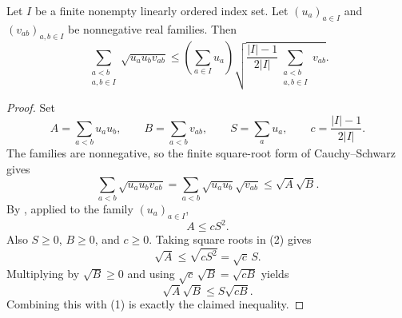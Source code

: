 \begin{helper}
Let $I$ be a finite nonempty linearly ordered index set.  Let
$(u_a)_{a\in I}$ and $(v_{ab})_{a,b\in I}$ be nonnegative real families.  Then
\[
\sum_{\substack{a<b\\a,b\in I}}\sqrt{u_a u_b v_{ab}}
\le
\left(\sum_{a\in I}u_a\right)
\sqrt{
\frac{|I|-1}{2|I|}
\sum_{\substack{a<b\\a,b\in I}}v_{ab}}.
\]
\end{helper}
\begin{proof}
Set
\[
A=\sum_{a<b}u_a u_b,\qquad
B=\sum_{a<b}v_{ab},\qquad
S=\sum_a u_a,\qquad
c=\frac{|I|-1}{2|I|}.
\]
The families are nonnegative, so the finite square-root form of
Cauchy--Schwarz gives
\[
\sum_{a<b}\sqrt{u_a u_b v_{ab}}
=\sum_{a<b}\sqrt{u_a u_b}\sqrt{v_{ab}}
\le \sqrt{A}\sqrt{B}. \tag{1}
\]
By , applied to the family
$(u_a)_{a\in I}$,
\[
A\le cS^2. \tag{2}
\]
Also $S\ge 0$, $B\ge 0$, and $c\ge 0$.  Taking square roots in (2) gives
\[
\sqrt A\le \sqrt{cS^2}=\sqrt c\,S.
\]
Multiplying by $\sqrt B\ge 0$ and using
$\sqrt c\,\sqrt B=\sqrt{cB}$ yields
\[
\sqrt A\sqrt B\le S\sqrt{cB}.
\]
Combining this with (1) is exactly the claimed inequality.
\end{proof}
